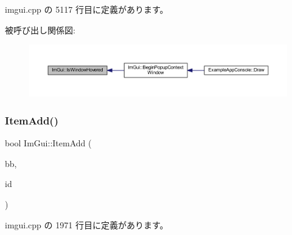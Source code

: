  imgui.\+cpp の 5117 行目に定義があります。

被呼び出し関係図\+:\nopagebreak
\begin{figure}[H]
\begin{center}
\leavevmode
\includegraphics[width=350pt]{namespace_im_gui_aaed1ebf40cc2cb2ec30b0ba39b91d4a5_icgraph}
\end{center}
\end{figure}
\mbox{\label{namespace_im_gui_a454e81b7c3befcc51c900f2fb3bd5a9a}} 
\subsubsection{\texorpdfstring{Item\+Add()}{ItemAdd()}}
{\footnotesize\ttfamily bool Im\+Gui\+::\+Item\+Add (\begin{DoxyParamCaption}\item[{const \mbox{\hyperlink{struct_im_rect}{Im\+Rect}} \&}]{bb,  }\item[{\mbox{\hyperlink{imgui_8h_a1785c9b6f4e16406764a85f32582236f}{Im\+Gui\+ID}}}]{id }\end{DoxyParamCaption})}



 imgui.\+cpp の 1971 行目に定義があります。

